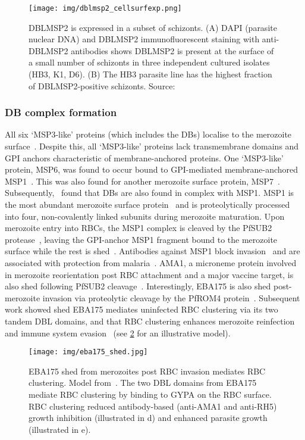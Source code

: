 \documentclass[12pt]{article}
\begin{document}
\begin{figure}
    \texttt{[image: img/dblmsp2\_cellsurfexp.png]}
    \caption{DBLMSP2 is expressed in a subset of schizonts.
    (A) DAPI (parasite nuclear DNA) and DBLMSP2 immunofluorescent staining with
    anti-DBLMSP2 antibodies shows DBLMSP2 is present at the surface of a small number of
    schizonts in three independent cultured isolates (HB3, K1, D6). (B) The HB3 parasite 
    line has the highest fraction of DBLMSP2-positive schizonts.
    Source:~\cite{AmambuaNgwa2012}
    }
    \label{fig:dblmsp2_cellsurfexp}
\end{figure}
 
\subsubsection{DB complex formation}
All six `MSP3-like' proteins (which includes the DBs) localise to the merozoite
surface~\cite{singh_conserved_2009}. Despite this, all
`MSP3-like' proteins lack transmembrane domains and GPI anchors characteristic of membrane-anchored proteins. 
One `MSP3-like' protein, MSP6, was found to occur bound to GPI-mediated
membrane-anchored MSP1~\cite{Trucco2001}. This was also found for another merozoite
surface protein, MSP7~\cite{Pachebat2001}. Subsequently,~\cite{Lin2014} found that DBs
are also found in complex with MSP1. MSP1 is the most abundant merozoite surface
protein~\cite{Gilson2006} 
and is proteolytically processed into four, non-covalently linked subunits
during merozoite maturation. Upon merozoite entry into RBCs, the MSP1 complex is cleaved by the
PfSUB2 protease~\cite{Harris2005}, leaving the GPI-anchor MSP1 fragment bound to the merozoite
surface while the rest is shed~\cite{blackman_single_1990,Harris2005}. Antibodies
against MSP1 block invasion~\cite{blackman_single_1990} and are associated with
protection from malaria~\cite{Osier2008}.
AMA1, a microneme protein involved in
merozoite reorientation post RBC attachment and a major vaccine target, is also shed
following PfSUB2 cleavage~\cite{Harris2005}. Interestingly, EBA175 is also shed post-merozoite invasion
via proteolytic cleavage by the PfROM4 protein~\cite{ODonnell2006}. Subsequent work showed
shed EBA175 mediates uninfected RBC clustering via its two tandem DBL domains, 
and that RBC clustering enhances merozoite reinfection and
immune system evasion~\cite{Paing2018} (see \cref{fig:eba175_shed} for an illustrative model).

\begin{figure}
    \texttt{[image: img/eba175\_shed.jpg]}
    \caption{EBA175 shed from merozoites post RBC invasion mediates RBC clustering.
    Model from~\cite{Paing2018}. The two DBL domains from EBA175 mediate RBC clustering
    by binding to GYPA on the RBC surface.  RBC clustering reduced antibody-based
    (anti-AMA1 and anti-RH5) growth inhibition (illustrated in d) and enhanced parasite
    growth (illustrated in e).
    }
    \label{fig:eba175_shed}
\end{figure}
\end{document}
